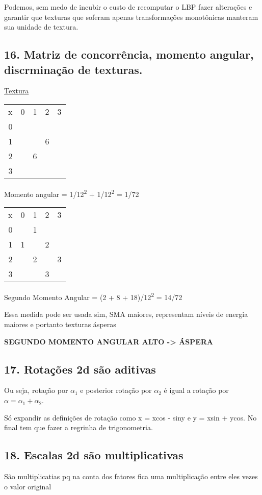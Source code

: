 \documentclass[twocolumn, 9pt]{article}
\begin{document}
Podemos, sem medo de incubir o custo de recomputar o LBP fazer alterações e garantir que texturas que soferam apenas transformações monotônicas manteram sua unidade de textura.
\subsection*{16. Matriz de concorrência, momento angular, discrminação de texturas.}
\label{sec:orgb2f9b32}
\hyperref[sec:org48121c0]{Textura}
\begin{center}
\begin{tabular}{rrrrr}
x & 0 & 1 & 2 & 3\\[0pt]
0 &  &  &  & \\[0pt]
1 &  &  & 6 & \\[0pt]
2 &  & 6 &  & \\[0pt]
3 &  &  &  & \\[0pt]
\end{tabular}
\end{center}

Momento angular = 1/12\textsuperscript{2} + 1/12\textsuperscript{2} = 1/72

\begin{center}
\begin{tabular}{rrrrr}
x & 0 & 1 & 2 & 3\\[0pt]
0 &  & 1 &  & \\[0pt]
1 & 1 &  & 2 & \\[0pt]
2 &  & 2 &  & 3\\[0pt]
3 &  &  & 3 & \\[0pt]
\end{tabular}
\end{center}

Segundo Momento Angular = (2 + 8 + 18)/12\textsuperscript{2} = 14/72

Essa medida pode ser usada sim, SMA maiores, representam níveis de energia maiores e portanto texturas ásperas

\textbf{SEGUNDO MOMENTO ANGULAR ALTO -> ÁSPERA}
\subsection*{17. Rotações 2d são aditivas}
\label{sec:orgd887ed8}
Ou seja, rotação por \(\alpha_1\) e posterior rotação por \(\alpha_2\) é igual a rotação por \(\alpha = \alpha_1 + \alpha_2\).

Só expandir as definições de rotação como x = xcos - siny e y = xsin + ycos. No final tem que fazer a regrinha de trigonometria.
\subsection*{18. Escalas 2d são multiplicativas}
\label{sec:org2cd53dc}
São multiplicatias pq na conta dos fatores fica uma multiplicação entre eles vezes o valor original
\end{document}
